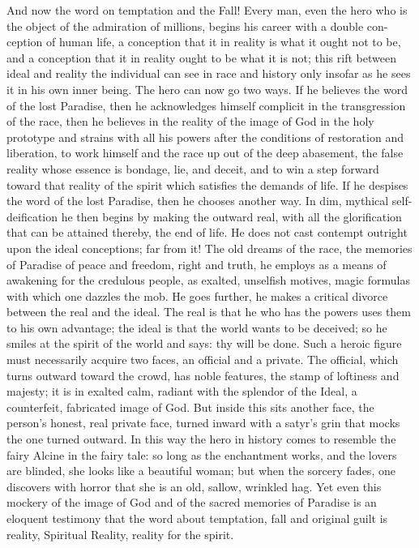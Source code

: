 \documentclass[12pt,a4paper,openany]{book}
\newcommand{\opage}[1]{\marginnote{\footnotesize\textit{[#1]}}}
\begin{document}
And now the word on temptation and the Fall! Every man,
even the hero who is the object of the admiration of millions,
begins his career with a double con-
\setcounter{footnote}{0}%
\opage{304}ception of human life, a conception that it
in reality is what it ought not to be, and a
conception that it in reality ought to be what
it is not; this rift between ideal and reality
the individual can see in race and history only insofar as
he sees it in his own inner being. The hero can now go
two ways. If he believes the word of the lost Paradise,
then he acknowledges himself complicit in the transgression
of the race, then he believes in the reality of the image of God in the
holy prototype and strains with all his powers after the conditions of restoration
and liberation, to work
himself and the race up out of the deep abasement, the false
reality whose essence is bondage, lie, and deceit,
and to win a step forward toward that reality of the spirit
which satisfies the demands of life. If he despises the word
of the lost Paradise, then he chooses another way.
In dim, mythical self-deification he then begins by
making the outward real, with all the glorification
that can be attained thereby, the end of life.
He does not cast contempt outright upon the ideal conceptions;
far from it! The old dreams of the race, the memories of Paradise
of peace and freedom, right and truth, he employs
as a means of awakening for the credulous people, as
exalted, unselfish motives, magic formulas
with which one dazzles the mob. He goes further, he makes
a critical divorce between the real and the ideal.
The real is that he who has the powers uses them
to his own advantage; the ideal is that the world wants to be deceived;
so he smiles at the spirit of the world and says: thy
will be done. Such a heroic figure must necessarily acquire
two faces, an official and a private. The official, which
\setcounter{footnote}{0}%
\opage{305}turns outward toward the crowd, has noble features, the stamp of
loftiness and majesty; it is in exalted calm, radiant
with the splendor of the Ideal, a counterfeit, fabricated image of God.
But inside this sits another face, the person's
honest, real private face, turned inward with a satyr's grin
that mocks the one turned outward. In this way
the hero in history comes to resemble the fairy Alcine in
the fairy tale: so long as the enchantment works, and the lovers
are blinded, she looks like a beautiful woman; but
when the sorcery fades, one discovers with horror
that she is an old, sallow, wrinkled hag. Yet even
this mockery of the image of God and of the sacred memories of Paradise
is an eloquent testimony that the word about
temptation, fall and original guilt is reality,
Spiritual Reality, reality for the spirit.
\end{document}
